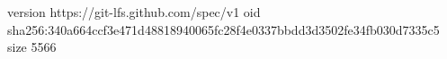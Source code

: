 version https://git-lfs.github.com/spec/v1
oid sha256:340a664ccf3e471d48818940065fc28f4e0337bbdd3d3502fe34fb030d7335c5
size 5566

